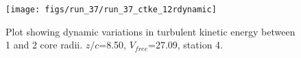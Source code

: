 \begin{figure}[H]
\centering
\texttt{[image: figs/run\_37/run\_37\_ctke\_12rdynamic]}
\caption{Plot showing dynamic variations in turbulent kinetic energy between 1 and 2 core radii. $z/c$=8.50, $V_{free}$=27.09, station 4.}
\label{fig:run_37_ctke_12rdynamic}
\end{figure}


